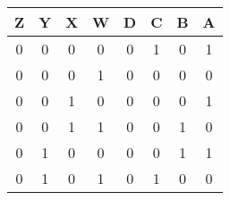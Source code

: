 \begin{tabular}{|c|c|c|c||c|c|c|c|}
\hline
Z & Y & X & W & D & C & B & A\\
\hline
0 & 0 & 0 & 0 & 0 & 1 & 0 & 1\\
0 & 0 & 0 & 1 & 0 & 0 & 0 & 0\\
0 & 0 & 1 & 0 & 0 & 0 & 0 & 1\\
0 & 0 & 1 & 1 & 0 & 0 & 1 & 0\\
0 & 1 & 0 & 0 & 0 & 0 & 1 & 1\\
0 & 1 & 0 & 1 & 0 & 1 & 0 & 0\\
\hline
\end{tabular}
